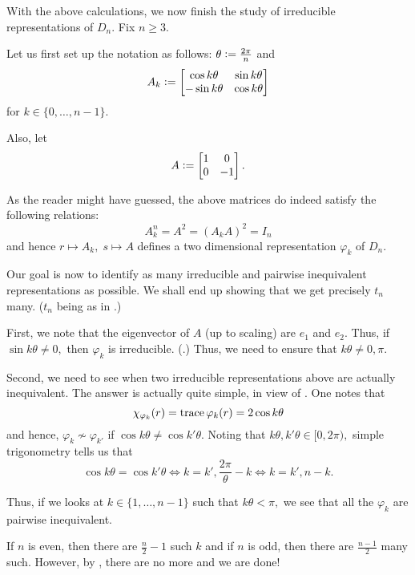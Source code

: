\begin{ex} \label{ex:finishingDn}
	With the above calculations, we now finish the study of irreducible representations of $D_n.$ Fix $n \ge 3.$

	Let us first set up the notation as follows: $\theta \vcentcolon= \frac{2\pi}{n}$ and
	\begin{equation*} 
		A_k \vcentcolon= \begin{bmatrix} \cos k\theta & \sin k\theta \\ -\sin k\theta & \cos k\theta \end{bmatrix}
	\end{equation*}
	for $k \in \{0, \ldots, n - 1\}.$

	Also, let
	\begin{equation*} 
		A \vcentcolon= \begin{bmatrix} 1 & 0 \\ 0 & -1 \end{bmatrix}.
	\end{equation*}

	As the reader might have guessed, the above matrices do indeed satisfy the following relations:
	\begin{equation*} 
		A_k^n = A^2 = (A_kA)^2 = I_n
	\end{equation*}
	and hence $r \mapsto A_k,\; s \mapsto A$ defines a two dimensional representation $\varphi_k$ of $D_n.$

	Our goal is now to identify as many irreducible and pairwise inequivalent representations as possible. We shall end up showing that we get precisely $t_n$ many. ($t_n$ being as in .)

	First, we note that the eigenvector of $A$ (up to scaling) are $e_1$ and $e_2.$ Thus, if $\sin k\theta \neq 0,$ then $\varphi_k$ is irreducible. (.) Thus, we need to ensure that $k\theta \neq 0, \pi.$

	Second, we need to see when two irreducible representations above are actually inequivalent. The answer is actually quite simple, in view of . One notes that
	\begin{equation*} 
		\chi_{\varphi_k}(r) = \operatorname{trace} \varphi_k(r) = 2\cos k\theta
	\end{equation*}
	and hence, $\varphi_k \not\sim \varphi_{k'}$ if $\cos k\theta \neq \cos k'\theta.$ Noting that $k\theta, k'\theta \in [0, 2\pi),$ simple trigonometry tells us that
	\begin{equation*} 
		\cos k\theta = \cos k'\theta \iff k = k', \frac{2\pi}{\theta} - k \iff k = k', n - k.
	\end{equation*}

	Thus, if we looks at $k \in \{1, \ldots, n - 1\}$ such that $k\theta < \pi,$ we see that all the $\varphi_k$ are pairwise inequivalent.

	If $n$ is even, then there are $\frac{n}{2} - 1$ such $k$ and if $n$ is odd, then there are $\frac{n-1}{2}$ many such. However, by , there are no more and we are done!
\end{ex}

